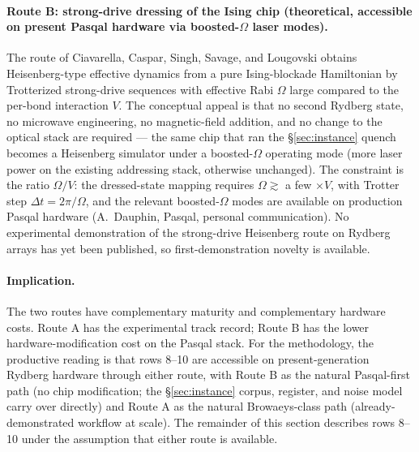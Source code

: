 \documentclass[10pt]{article}
\begin{document}
\paragraph{Route B: strong-drive dressing of the Ising chip (theoretical, accessible on present Pasqal hardware via boosted-$\Omega$ laser modes).}
The route of Ciavarella, Caspar, Singh, Savage, and Lougovski \cite{ciavarella2022heisenberg} obtains Heisenberg-type effective dynamics from a pure Ising-blockade Hamiltonian by Trotterized strong-drive sequences with effective Rabi $\Omega$ large compared to the per-bond interaction $V$. The conceptual appeal is that no second Rydberg state, no microwave engineering, no magnetic-field addition, and no change to the optical stack are required --- the same chip that ran the \S\ref{sec:instance} quench becomes a Heisenberg simulator under a boosted-$\Omega$ operating mode (more laser power on the existing addressing stack, otherwise unchanged). The constraint is the ratio $\Omega/V$: the dressed-state mapping requires $\Omega \gtrsim$ a few $\times V$, with Trotter step $\Delta t = 2\pi/\Omega$, and the relevant boosted-$\Omega$ modes are available on production Pasqal hardware (A.~Dauphin, Pasqal, personal communication). No experimental demonstration of the strong-drive Heisenberg route on Rydberg arrays has yet been published, so first-demonstration novelty is available.

\paragraph{Implication.}
The two routes have complementary maturity and complementary hardware costs. Route A has the experimental track record; Route B has the lower hardware-modification cost on the Pasqal stack. For the methodology, the productive reading is that rows 8--10 are accessible on present-generation Rydberg hardware through either route, with Route B as the natural Pasqal-first path (no chip modification; the \S\ref{sec:instance} corpus, register, and noise model carry over directly) and Route A as the natural Browaeys-class path (already-demonstrated workflow at scale). The remainder of this section describes rows 8--10 under the assumption that either route is available.
\end{document}
